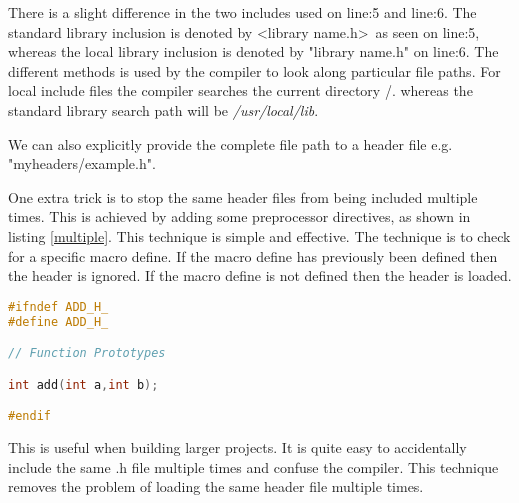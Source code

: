 There is a slight difference in the two includes used on line:5 and line:6. The standard library inclusion is denoted by \textless{library name.h}\textgreater \, as seen on line:5, whereas the local library inclusion is denoted by "library name.h" on line:6. The different methods is used by the compiler to look along particular file paths. For local include files the compiler searches the current directory /. whereas the standard library search path will be \textit{/usr/local/lib}. 

We can also explicitly provide the complete file path to a header file e.g. "myheaders/example.h".

One extra trick is to stop the same header files from being included multiple times. This is achieved by adding some preprocessor directives, as shown in listing \ref{multiple}. This technique is simple and effective. The technique is to check for a specific macro define. If the macro define has previously been defined then the header is ignored. If the macro define is not defined then the header is loaded.\\

\begin{lstlisting}[language=C,caption={File add.h, full header file},captionpos=b,label=multiple]  
#ifndef ADD_H_
#define ADD_H_

// Function Prototypes

int add(int a,int b);

#endif
\end{lstlisting}

 This is useful when building larger projects. It is quite easy to accidentally include the same .h file multiple times and confuse the compiler. This technique removes the problem of loading the same header file multiple times.\\

